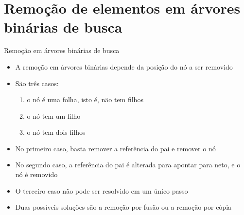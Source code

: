 \section{Remoção de elementos em árvores binárias de busca}


\begin{frame}[fragile]{Remoção em árvores binárias de busca}

    \begin{itemize}
	    \item A remoção em árvores binárias { depende da posição do nó} a ser removido

        \item São { três} casos:

        \begin{enumerate}
            \item o nó é uma folha, isto é, não tem filhos

            \item o nó tem um filho

            \item o nó tem dois filhos
        \end{enumerate}

        \item No primeiro caso, basta { remover} a referência do pai e {remover} o nó

        \item No segundo caso, a referência do { pai} é alterada para apontar para neto, e o nó é removido

        \item O terceiro caso não pode ser resolvido em um único passo

        \item Duas possíveis soluções são a remoção por fusão ou a remoção por cópia
    \end{itemize}
\end{frame} 

